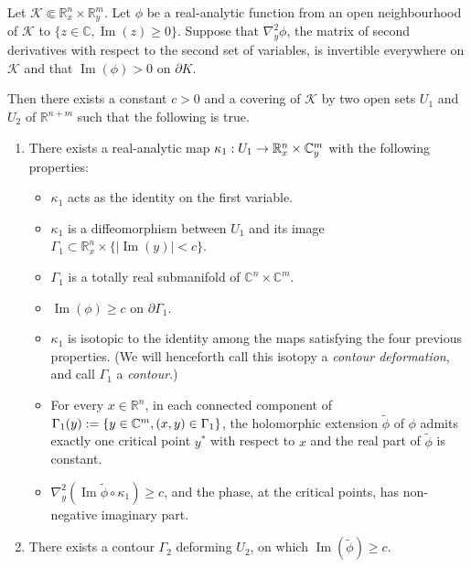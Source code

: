 \documentclass[10pt]{amsart}
\theoremstyle{definition}\newtheorem{defi}[theo]{Definition}\newtheorem{rema}[theo]{Remark}\newtheorem{exam}[theo]{Example}\newtheorem{exem}[theo]{Example}\newtheorem{nota}[theo]{Notation}
\DeclareMathOperator{\im}{Im}
\newcommand{\clK}{\mathcal{K}}
\newcommand\1{\mathds{1}}
\newcommand{\R}{\mathbb{R}}
\newcommand{\C}{\mathbb{C}}
\renewcommand*{\to}{\mathchoice{\longrightarrow}{\rightarrow}{\rightarrow}{\rightarrow}}
\begin{document}
\begin{prop}\label{prop:contour}
Let $\clK\Subset \R^n_x\times \R^m_y$. Let $\phi$ be a real-analytic function from an open neighbourhood of $\clK$ to $\{z\in \C,\im(z)\geq 0\}$. Suppose that $\nabla^2_y\phi$, the matrix of second derivatives with respect to the second set of variables, is invertible everywhere on $\clK$ and that $\im(\phi)>0$ on $\partial K$.

Then there exists a constant $c>0$ and a covering of $\clK$ by two open sets $U_1$ and $U_2$ of $\R^{n+m}$ such that the following is true.
\begin{enumerate}
\item\label{prop3.10.1} There exists a real-analytic map $\kappa_1:U_1\to \R^n_x\times \C^m_y$ with the following properties:
\begin{itemize}
\item $\kappa_1$ acts as the identity on the first variable.
\item $\kappa_1$ is a diffeomorphism between $U_1$ and its image $\Gamma_1\subset \R^n_x\times \{\lvert\im(y)|<c\}$.
\item $\Gamma_1$ is a totally real submanifold of $\C^n\times \C^m$.
\item $\im(\phi)\geq c$ on $\partial \Gamma_1$.
\item $\kappa_1$ is isotopic to the identity among the maps satisfying the four previous properties. (We will henceforth call this isotopy a \emph{contour deformation}, and call $\Gamma_1$ a \emph{contour}.)
\item For every $x\in \R^n$, in each connected component of $\Gamma_1(y):=\{y\in \C^m,\linebreak (x,y)\in \Gamma_1\}$, the holomorphic extension $\widetilde{\phi}$ of $\phi$ admits exactly one critical point $y^*$ with respect to $x$ and the real part of $\widetilde{\phi}$ is constant.
\item $\nabla^2_y(\im\widetilde{\phi}\circ \kappa_1)\geq c$, and the phase, at the critical points, has non-negative imaginary part.
\end{itemize}
\item\label{prop3.10.2} There exists a contour $\Gamma_2$ deforming $U_2$, on which $\im(\widetilde{\phi})\geq c$.
\end{enumerate}
\end{prop}
\end{document}
